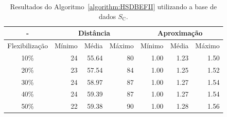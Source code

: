 \begin{table}[!htb]
  \caption{Resultados do Algoritmo~\ref{algorithm:HSDBEFII} utilizando a base de dados $S_{\text{C}}$.}
  \label{table:SZTGMABR}
  \centering
  \begin{tabular}{|c|r|r|r|r|r|r|}
    \hline
      -            & \multicolumn{3}{c|}{Distância}             & \multicolumn{3}{c|}{Aproximação}           \\ \hline
    Flexibilização & Mínimo       & Média        & Máximo       & Mínimo       & Média        & Máximo       \\ \hline  
    10\%           & 24           & 55.64        & 80           & 1.00         & 1.23         & 1.50         \\ \hline
    20\%           & 23           & 57.54        & 84           & 1.00         & 1.25         & 1.52         \\ \hline
    30\%           & 24           & 58.97        & 87           & 1.00         & 1.27         & 1.54         \\ \hline
    40\%           & 24           & 59.39        & 87           & 1.00         & 1.27         & 1.54         \\ \hline
    50\%           & 22           & 59.38        & 90           & 1.00         & 1.28         & 1.56         \\ \hline    
  \end{tabular}
\end{table}